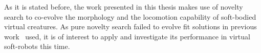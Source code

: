 As it is stated before, the work presented in this thesis makes use of novelty search to co-evolve the morphology and the locomotion capability of soft-bodied virtual creatures. As pure novelty search failed to evolve fit solutions in previous work~\citep{lehman2011evolving} used, it is of interest to apply and investigate its performance in virtual soft-robots this time.

